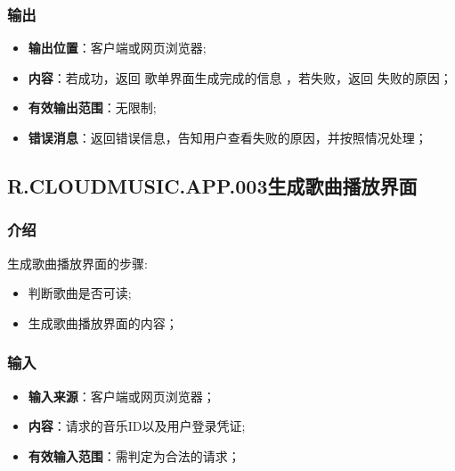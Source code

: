 \begin{enumerate}
\subsubsection{输出}
\begin{itemize}
	\item \textbf{输出位置}：客户端或网页浏览器;
	\item \textbf{内容}：若成功，返回 歌单界面生成完成的信息 ，若失败，返回 失败的原因；
	\item \textbf{有效输出范围}：无限制;
	\item \textbf{错误消息}：返回错误信息，告知用户查看失败的原因，并按照情况处理；
\end{itemize}

\subsection{R.CLOUDMUSIC.APP.003生成歌曲播放界面}
\subsubsection{介绍}
生成歌曲播放界面的步骤:
	\begin{itemize}
		\item 判断歌曲是否可读;
		\item 生成歌曲播放界面的内容；
	\end{itemize}
\subsubsection{输入}
	\begin{itemize}
		\item \textbf{输入来源}：客户端或网页浏览器；
		\item \textbf{内容}：请求的音乐ID以及用户登录凭证;
		\item \textbf{有效输入范围}：需判定为合法的请求；
	\end{itemize}

\end{enumerate}
